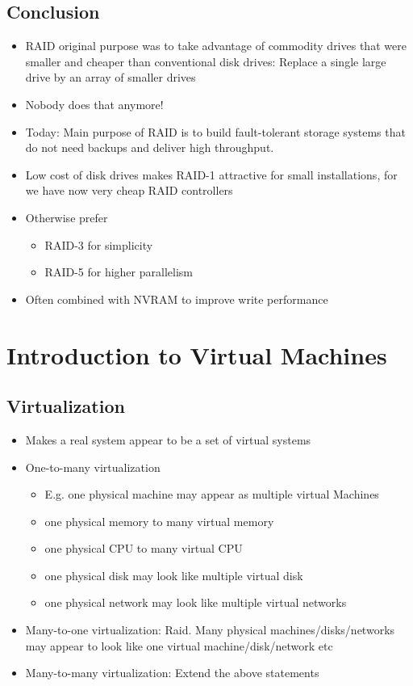 \documentclass[12pt]{article}
\begin{document}
\subsection{Conclusion}
\begin{itemize}
    \item RAID original purpose was to take advantage of commodity drives that were smaller and cheaper than conventional disk drives: Replace a single large drive by an array of smaller drives 
    \item Nobody does that anymore! 
    \item Today: Main purpose of RAID is to build fault-tolerant storage systems that do not need backups and deliver high throughput. 
    \item Low cost of disk drives makes RAID-1 attractive for small installations, for we have now very cheap RAID controllers
    \item Otherwise prefer \begin{itemize}
        \item RAID-3 for simplicity 
        \item RAID-5 for higher parallelism 
    \end{itemize}
    \item Often combined with NVRAM to improve write performance
\end{itemize}

\section{Introduction to Virtual Machines}
\subsection{Virtualization}
\begin{itemize}
    \item Makes a real system appear to be a set of virtual systems 
    \item One-to-many virtualization \begin{itemize}
        \item E.g. one physical machine may appear as multiple virtual Machines
        \item one physical memory to many virtual memory
        \item one physical CPU to many virtual CPU
        \item one physical disk may look like multiple virtual disk
        \item one physical network may look like multiple virtual networks
    \end{itemize}
    \item Many-to-one virtualization: Raid. Many physical machines/disks/networks may appear to look like one virtual machine/disk/network etc
    \item Many-to-many virtualization: Extend the above statements
\end{itemize}
\end{document}

